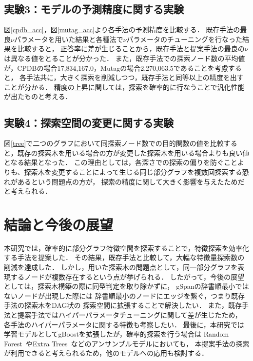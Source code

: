 \section{実験3：モデルの予測精度に関する実験}
図\ref{cpdb_acc}，図\ref{mutag_acc}より各手法の予測精度を比較する．
既存手法の最良$\nu$パラメータを用いた結果と各種法で$\nu$パラメータのチューニングを行なった結果を比較すると，
正答率に差が生じることから，既存手法と提案手法の最良の$\nu$は異なる値をとることが分かった．
また，既存手法での探索ノード数の平均値が，CPDBの場合17,834,167.0，Mutagの場合2,270,063.5であることを考慮すると，
各手法共に，大きく探索を削減しつつ，既存手法と同等以上の精度を出すことが分かる．
精度の上昇に関しては，探索を確率的に行なうことで汎化性能が出たものと考える．

\section{実験4：探索空間の変更に関する実験}
図\ref{tree}で二つのグラフにおいて同探索ノード数での目的関数の値を比較すると，既存の探索木を用いる場合の方が変更した探索木を用いる場合よりも良い値となる結果となった．
この理由としては，各深さでの探索の偏りを防ぐことよりも、探索木を変更することによって生じる同じ部分グラフを複数回探索する恐れがあるという問題点の方が，
探索の精度に関して大きく影響を与えたためだと考えられる．


\chapter{結論と今後の展望}
本研究では，確率的に部分グラフ特徴空間を探索することで，特徴探索を効率化する手法を提案した．
その結果，既存手法と比較して，大幅な特徴量探索数の削減を達成した．
しかし，用いた探索木の問題点として，同一部分グラフを表現するノードが複数存在するという点が挙げられる．
したがって，今後の展望としては，探索木構築の際に同型判定を取り除かずに，
gSpanの辞書順最小ではないノードが出現した際には
辞書順最小のノードにエッジを繋ぐ，つまり既存手法の探索木をDAG状の
探索空間に拡張することで解決したい．
また，既存手法と提案手法ではハイパーパラメータチューニングに関して差が生じたため，
各手法のハイパーパラメータに関する特徴も考察したい．
最後に，本研究では学習モデルとしてgBoostを拡張したが，確率的探索を行う場合は
Random Forest~\cite{RF}やExtra Trees~\cite{ET}などのアンサンブルモデルにおいても，
本提案手法の探索が利用できると考えられるため，他のモデルへの応用も検討する．


